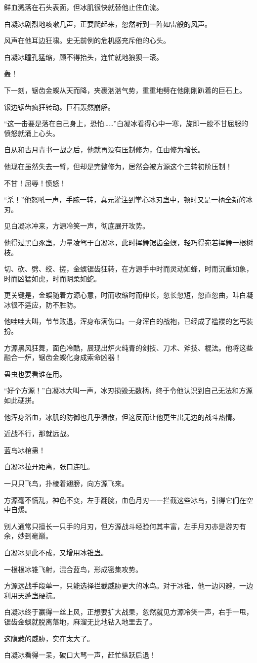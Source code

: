 \begin{this_body}
鲜血溅落在石头表面，但冰肌很快就替他止住血流。

白凝冰剧烈地咳嗽几声，正要爬起来，忽然听到一阵如雷般的风声。

风声在他耳边狂啸。史无前例的危机感充斥他的心头。

白凝冰瞳孔猛缩，顾不得抬头，连忙就地狼狈一滚。

轰！

下一刻，锯齿金蜈从天而降，夹裹汹汹气势，重重地劈在他刚刚趴着的巨石上。

银边锯齿疯狂转动。巨石轰然崩解。

“这一击要是落在自己身上，恐怕……”白凝冰看得心中一寒，旋即一股不甘屈服的愤怒就涌上心头。

自从和古月青书一战之后，他就再没有压制修为，任由修为增长。

他现在虽然失去一臂，但却是完整修为，居然会被方源这个三转初阶压制！

不甘！屈辱！愤怒！

“杀！”他怒吼一声，手腕一转，真元灌注到掌心冰刃蛊中，顿时又是一柄全新的冰刃。

见白凝冰冲来，方源冷笑一声，彻底展开攻势。

他得过黑白豕蛊，力量凌驾于白凝冰，此时挥舞锯齿金蜈，轻巧得宛若挥舞一根树枝。

切、砍、劈、绞、搓，金蜈锯齿狂转，在方源手中时而灵动如蜂，时而沉重如象，时而凶猛如虎，时而阴柔如蛇。

更关键是，金蜈随着方源心意，时而收缩时而伸长，忽长忽短，忽直忽曲，叫白凝冰很不适应，防不胜防。

他哇哇大叫，节节败退，浑身布满伤口。一身浑白的战袍，已经成了褴褛的乞丐装扮。

方源黑风狂舞，面色冷酷，展现出炉火纯青的剑技、刀术、斧技、棍法。他将这些融合一炉，锯齿金蜈化身成索命凶器！

蛊虫也要看谁在用。

“好个方源！”白凝冰大叫一声，冰刃损毁无数柄，终于令他认识到自己无法和方源如此硬拼。

他浑身浴血，冰肌的防御也几乎溃散，但这反而让他更生出无边的战斗热情。

近战不行，那就远战。

蓝鸟冰棺蛊！

白凝冰拉开距离，张口连吐。

一只只飞鸟，扑棱着翅膀，向方源飞来。

方源毫不慌乱，神色不变，左手翻腕，血色月刃一一拦截这些冰鸟，引得它们在空中自爆。

别人通常只擅长一只手的月刃，但方源战斗经验何其丰富，左手月刃亦是游刃有余，妙到毫巅。

白凝冰见此不成，又增用冰锥蛊。

一根根冰锥飞射，混合蓝鸟，形成密集攻势。

方源远战手段单一，只能选择拦截威胁更大的冰鸟。对于冰锥，他一边闪避，一边利用天蓬蛊硬抗。

白凝冰终于赢得一丝上风，正想要扩大战果，忽然就见方源冷笑一声，右手一甩，锯齿金蜈就脱离落地，麻溜无比地钻入地里去了。

这隐藏的威胁，实在太大了。

白凝冰看得一呆，破口大骂一声，赶忙纵跃后退！

\end{this_body}

